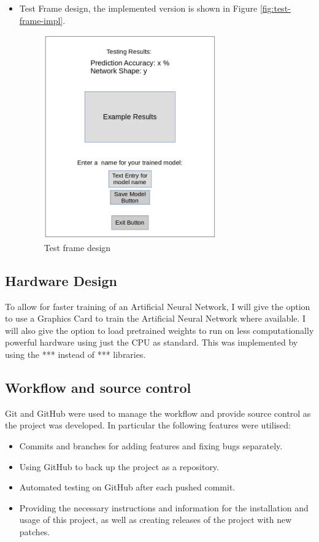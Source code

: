 \documentclass[./project-report/src/latex/project-report.tex]{subfiles}
\begin{document}
\begin{itemize}
    \pagebreak
    
    \item Test Frame design, the implemented version is shown in Figure \ref{fig:test-frame-impl}.
        \begin{figure}[h!]
        \centering
        \includegraphics[width=0.7\textwidth]{./project-report/src/images/testing-frame-design.png}
        \caption{Test frame design}
        \label{fig:testing-frame-design}
        \end{figure}
\end{itemize}

\subsection{Hardware Design}

To allow for faster training of an Artificial Neural Network, I will give the option to use a Graphics Card to train the Artificial Neural Network where available. 
I will also give the option to load pretrained weights to run on less computationally powerful hardware using just the CPU as standard. This was implemented by using the *** 
instead of *** libraries.

\subsection{Workflow and source control}

Git and GitHub were used to manage the workflow and provide source control as the project was developed. In particular the following features were utilised:

\begin{itemize}
    \item Commits and branches for adding features and fixing bugs separately.
    \item Using GitHub to back up the project as a repository.
    \item Automated testing on GitHub after each pushed commit.
    \item Providing the necessary instructions and information for the installation and usage of this project, as well as creating releases of the project with new patches.
\end{itemize}
\end{document}
